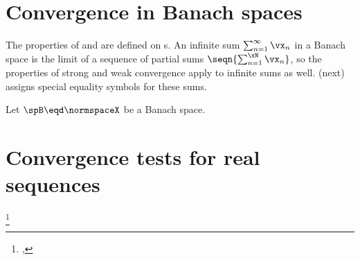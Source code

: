 \section{Convergence in Banach spaces}
The properties of  and  are defined on s.
An infinite sum $\sum_{n=1}^\infty \vx_n$ in a Banach space is the limit of a sequence of partial sums $\seqn{\sum_{n=1}^\xN\vx_n}$,
so the properties of strong and weak convergence apply to infinite sums as well.
 (next) assigns special equality symbols for these sums.
\begin{definition}
\label{def:eqs}
\label{def:eqw}
Let $\spB\eqd\normspaceX$ be a Banach space.
\end{definition}

\section{Convergence tests for real sequences}
\begin{theorem}
\footnote{
  ,
  }
\label{thm:series_comparison}
\end{theorem}


